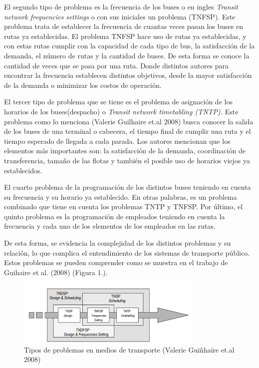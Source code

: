 \documentclass[preprint,11pt]{elsarticle}
\begin{document}
El segundo tipo de problema es la frecuencia de los buses o en ingles \textit{Transit network frequencies settings} o con sus iniciales un problema (TNFSP). Este problema trata de establecer la frecuencia de cuantas veces pasan los buses en rutas ya establecidas. El problema TNFSP hace uso de rutas ya establecidas, y con estas rutas cumplir con la capacidad de cada tipo de bus, la satisfacción de la demanda, el número de rutas y la cantidad de buses. De esta forma se conoce la cantidad de veces que se pasa por una ruta. Donde distintos autores para encontrar la frecuencia establecen distintos objetivos, desde la mayor satisfacción de la demanda o minimizar los costos de operación. 

El tercer tipo de problema que se tiene es el problema de asignación de los horarios de los buses(despacho) o \textit{Transit network timetabling (TNTP). }Este problema como lo menciona (Valerie Guilhaire et.al 2008) \cite{guihaire2008} busca conocer la salida de los buses de una terminal o cabecera, el tiempo final de cumplir una ruta y el tiempo esperado de llegada a cada parada. Los autores mencionan que los elementos más importantes son: la satisfacción de la demanda, coordinación de transferencia, tamaño de las flotas y también el posible uso de horarios viejos ya establecidos.

El cuarto problema de la programación de los distintos buses teniendo en cuenta su frecuencia y su horario ya establecido. En otras palabras, es un problema combinado que tiene en cuenta los problemas TNTP y TNFSP. Por último, el quinto problema es la programación de empleados teniendo en cuenta la frecuencia y cada uno de los elementos de los empleados en las rutas. 

De esta forma, se evidencia la complejidad de los distintos problemas y su relación, lo que complica el entendimiento de los sistemas de transporte público. Estos problemas se pueden comprender como se muestra en el trabajo de Guihaire et al. (2008) \cite{guihaire2008} (Figura 1.). 

\captionsetup[figure]{name=Figura}
\begin{figure}[H]
  \centering
  \includegraphics[width=0.8\textwidth]{tipos.png}
  \caption{Tipos de problemas en medios de transporte (Valerie Guiñhaire et.al 2008)}
  \label{fig:mi_imagen}
\end{figure}
\end{document}
